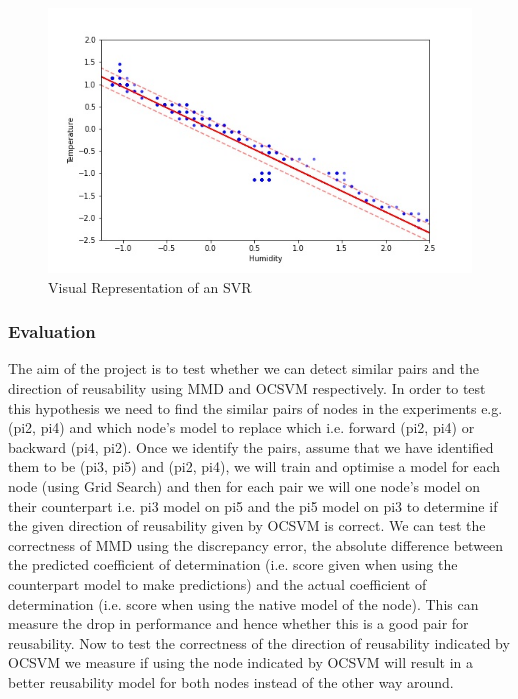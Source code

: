 \documentclass{mprop}
\begin{document}
\begin{figure}
\begin{center}
\includegraphics[scale=0.45]{SVR_representation.jpg}
\end{center}
\caption{\label{fig-SVRex}Visual Representation of an SVR}
\end{figure}

\subsubsection{Evaluation}

The aim of the project is to test whether we can detect similar pairs and the direction of reusability using MMD and OCSVM respectively. In order to test this hypothesis we need to find the similar pairs of nodes in the experiments e.g. (pi2, pi4) and which node's model to replace which  i.e. forward (pi2, pi4) or backward (pi4, pi2). Once we identify the pairs, assume that we have identified them to be (pi3, pi5) and (pi2, pi4), we will train and optimise a model for each node (using Grid Search) and then for each pair we will one node's model on their counterpart i.e. pi3 model on pi5 and the pi5 model on pi3 to determine if the given direction of reusability given by OCSVM is correct. We can test the correctness of MMD using the discrepancy error, the absolute difference between the predicted coefficient of determination (i.e. score given when using the counterpart model to make predictions) and the actual coefficient of determination (i.e. score when using the native model of the node). This can measure the drop in performance and hence whether this is a good pair for reusability. Now to test the correctness of the direction of reusability indicated by OCSVM we measure if using the node indicated by OCSVM will result in a better reusability model for both nodes instead of the other way around. 
\end{document}
